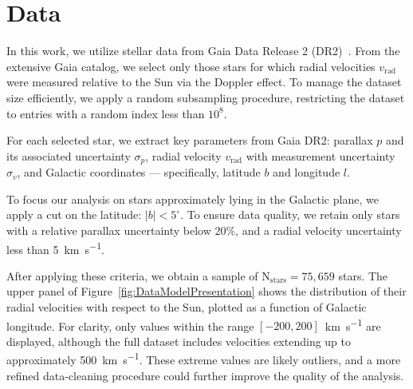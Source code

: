 \section{Data}

In this work, we utilize stellar data from Gaia Data Release 2 (DR2)~\cite{GAIADR2}.  
From the extensive Gaia catalog, we select only those stars 
for which radial velocities $v_{\text{rad}}$ were measured relative to the Sun via the Doppler effect.  
To manage the dataset size efficiently, we apply a random subsampling procedure, 
restricting the dataset to entries with a random index less than $10^8$.

For each selected star, we extract key parameters from Gaia DR2: 
parallax $p$ and its associated uncertainty $\sigma_{p}$, 
radial velocity $v_{\text{rad}}$ with measurement uncertainty $\sigma_{v}$, 
and Galactic coordinates — specifically, latitude $b$ and longitude $l$.

To focus our analysis on stars approximately lying in the Galactic plane, we apply a cut on the latitude: $\vert b \vert < 5^\circ$.  
To ensure data quality, we retain only stars with a relative parallax uncertainty below 20\%, 
and a radial velocity uncertainty less than 5~\unit{\kilo\meter\per\second}.  

After applying these criteria, we obtain a sample of $\text{N}_{\text{stars}} = 75{,}659$ stars. 
The upper panel of Figure~\ref{fig:DataModelPresentation} shows the distribution of their radial velocities with respect to the Sun, 
plotted as a function of Galactic longitude. For clarity, only values within the range $[-200, 200]$~\unit{\kilo\meter\per\second} are displayed, 
although the full dataset includes velocities extending up to approximately 500~\unit{\kilo\meter\per\second}. 
These extreme values are likely outliers, and a more refined data-cleaning procedure could further improve the quality of the analysis.

